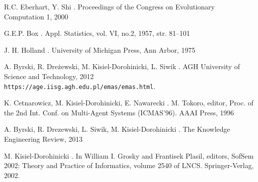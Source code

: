 \begin{thebibliography}{1}
R.C. Eberhart, Y. Shi
.
\newblock Proceedings of the Congress on Evolutionary Computation 1, 2000


G.E.P. Box 
.
\newblock Appl. Statistics, vol. VI, no.2, 1957, str. 81–101


J. H. Holland
.
\newblock  University of Michigan Press, Ann Arbor, 1975


A. Byrski, R. Dreżewski, M. Kisiel-Dorohinicki, L. Siwik
.
\newblock  AGH University of Science and Technology, 2012
\newblock \\\texttt{https://age.iisg.agh.edu.pl/emas/emas.html}.


K. Cetnarowicz, M. Kisiel-Dorohinicki, E. Nawarecki
.
\newblock  M. Tokoro, editor, Proc. of the 2nd Int. Conf. on Multi-Agent Systems (ICMAS'96). AAAI Press, 1996


 A. Byrski, R. Drezewski, L. Siwik, M. Kisiel-Dorohinicki
.
\newblock The Knowledge Engineering Review, 2013


M. Kisiel-Dorohinicki
.
\newblock In William I. Grosky and Frantisek Plasil, editors, SofSem 2002: Theory and Practice of Informatics, volume 2540 of LNCS. Springer-Verlag, 2002.

\end{thebibliography}
